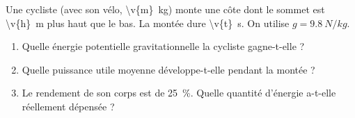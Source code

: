 Une cycliste (avec son vélo, \qty{\v{m}}{kg}) monte une côte dont le sommet est \qty{\v{h}}{m} plus haut que le bas. La montée dure \qty{\v{t}}{s}. On utilise $g = \qty{9.8}{N/kg}$.

\begin{enumerate}[label=\alph*)]
    \item Quelle énergie potentielle gravitationnelle la cycliste gagne-t-elle ?
    \item Quelle puissance utile moyenne développe-t-elle pendant la montée ?
    \item Le rendement de son corps est de \qty{25}{\percent}. Quelle quantité d'énergie a-t-elle réellement dépensée ?
\end{enumerate}
